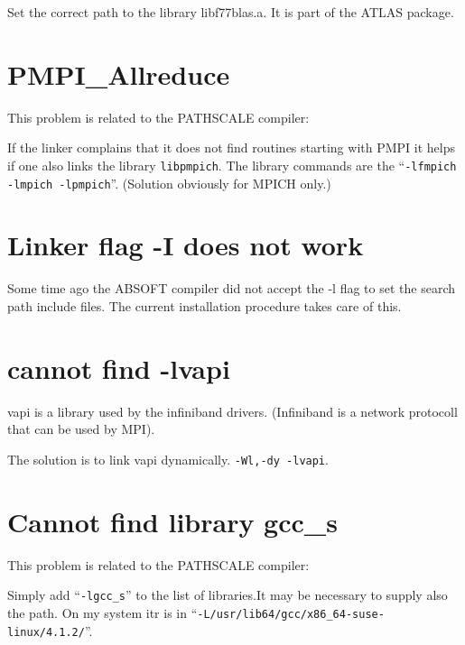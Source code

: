 \documentclass[a4paper,10pt]{report}
\newcommand{\mytt}[1]{{\tt #1}}
\begin{document}
Set the correct path to the library libf77blas.a. It is part of the ATLAS package. 


\section{PMPI\_Allreduce}
This problem is related to the PATHSCALE compiler:

If the linker complains that it does not find routines starting with
PMPI it helps if one also links the library \verb+libpmpich+. The
library commands are the
``\verb+-lfmpich -lmpich -lpmpich+''. (Solution obviously for MPICH
only.)

\section{Linker flag -I does not work}
Some time ago the ABSOFT compiler did not accept the -l flag to set
the search path include files. The current installation procedure
takes care of this.

\section{cannot find -lvapi}
vapi is a library used by the infiniband drivers. (Infiniband is a
network protocoll that can be used by MPI). 

The solution is to link vapi dynamically. \mytt{-Wl,-dy -lvapi}.



\section{Cannot find library gcc\_s}
This problem is related to the PATHSCALE compiler:

Simply add ``\verb+-lgcc_s+'' to the list of libraries.It may be
necessary to supply also the path. On my system itr is in
``\verb+-L/usr/lib64/gcc/x86_64-suse-linux/4.1.2/+''.
\end{document}
